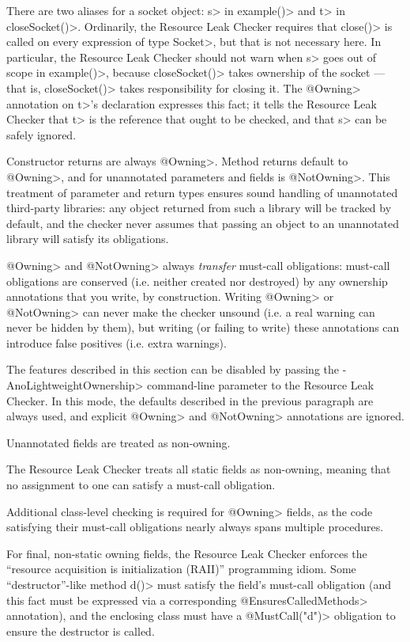 There are two aliases for a socket object: \<s> in \<example()> and \<t> in
\<closeSocket()>.  Ordinarily, the Resource Leak Checker requires that
\<close()> is called on every expression of type \<Socket>, but that is not
necessary here.  In particular, the Resource Leak Checker should not warn when
\<s> goes out of scope in \<example()>, because \<closeSocket()> takes ownership
of the socket --- that is, \<closeSocket()> takes responsibility for closing
it. The \<@Owning> annotation on \<t>'s declaration expresses this fact; it
tells the Resource Leak Checker that \<t> is the reference that ought to be
checked, and that \<s> can be safely ignored.

Constructor returns are always \<@Owning>.
Method returns default to \<@Owning>,
and for unannotated parameters and fields is \<@NotOwning>. This treatment of parameter and
return types ensures sound handling of unannotated third-party libraries: any
object returned from such a library will be tracked by default, and the checker
never assumes that passing an object to an unannotated library will satisfy its obligations.

\<@Owning> and \<@NotOwning> always \emph{transfer} must-call obligations: must-call
obligations are conserved (i.e. neither created nor destroyed) by any ownership annotations
that you write, by construction. Writing \<@Owning> or \<@NotOwning> can never make the checker
unsound (i.e. a real warning can never be hidden by them),
but writing (or failing to write) these annotations can introduce false positives (i.e. extra warnings).

The features described in this section can be disabled by passing the \<-AnoLightweightOwnership>
command-line parameter to the Resource Leak Checker.
In this mode, the defaults described in the previous paragraph are always used, and explicit \<@Owning>
and \<@NotOwning> annotations are ignored.



Unannotated fields are treated as non-owning.

The Resource Leak Checker treats all static fields as non-owning, meaning that no assignment to one
can satisfy a must-call obligation.

Additional class-level checking is required for \<@Owning>
fields, as the code
satisfying their must-call obligations nearly always spans multiple
procedures.

For final, non-static owning fields,
the Resource Leak Checker enforces the ``resource acquisition is
initialization (RAII)'' programming idiom.  Some
``destructor''-like method \<d()> must satisfy the field's must-call obligation
(and this fact must be expressed via a corresponding \<@EnsuresCalledMethods> annotation),
and the enclosing class must have a \<@MustCall("d")> obligation to
ensure the destructor is called.

